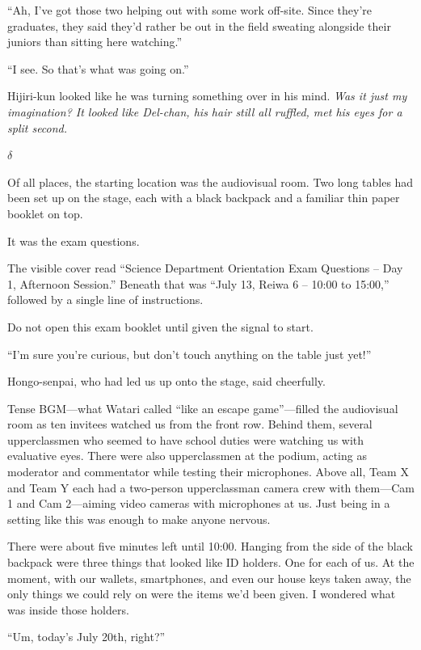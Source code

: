 \documentclass[
    a4paper,
    12pt,
    twoside,
    openany,
    UTF8,
    fontset=windows
]{ctexbook}
\begin{document}
``Ah, I've got those two helping out with some work off-site. Since they're graduates, they said they'd rather be out in the field sweating alongside their juniors than sitting here watching.''

``I see. So that's what was going on.''

Hijiri-kun looked like he was turning something over in his mind. \textit{Was it just my imagination? It looked like Del-chan, his hair still all ruffled, met his eyes for a split second.}

$\delta$

Of all places, the starting location was the audiovisual room. Two long tables had been set up on the stage, each with a black backpack and a familiar thin paper booklet on top.

It was the exam questions.

The visible cover read ``Science Department Orientation Exam Questions -- Day 1, Afternoon Session.'' Beneath that was ``July 13, Reiwa 6 -- 10:00 to 15:00,'' followed by a single line of instructions.

\begin{center}
Do not open this exam booklet until given the signal to start.
\end{center}

``I'm sure you're curious, but don't touch anything on the table just yet!''

Hongo-senpai, who had led us up onto the stage, said cheerfully.

Tense BGM---what Watari called ``like an escape game''---filled the audiovisual room as ten invitees watched us from the front row. Behind them, several upperclassmen who seemed to have school duties were watching us with evaluative eyes. There were also upperclassmen at the podium, acting as moderator and commentator while testing their microphones. Above all, Team X and Team Y each had a two-person upperclassman camera crew with them---Cam 1 and Cam 2---aiming video cameras with microphones at us. Just being in a setting like this was enough to make anyone nervous.

There were about five minutes left until 10:00. Hanging from the side of the black backpack were three things that looked like ID holders. One for each of us. At the moment, with our wallets, smartphones, and even our house keys taken away, the only things we could rely on were the items we'd been given. I wondered what was inside those holders.

``Um, today's July 20th, right?''
\end{document}
